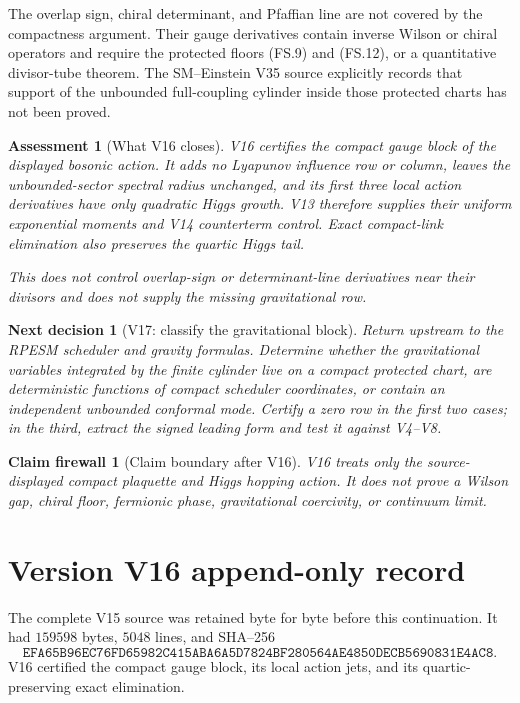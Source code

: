 \documentclass[11pt]{article}
\newtheorem{firewall}[theorem]{Claim firewall}
\newtheorem{decision}[theorem]{Next decision}
\newtheorem{assessment}[theorem]{Assessment}
\theoremstyle{remark}
\begin{document}
The overlap sign, chiral determinant, and Pfaffian line are not
covered by the compactness argument.  Their gauge derivatives
contain inverse Wilson or chiral operators and require the
protected floors \textup{(FS.9)} and \textup{(FS.12)}, or a
quantitative divisor-tube theorem.  The SM--Einstein V35 source
explicitly records that support of the unbounded full-coupling
cylinder inside those protected charts has not been proved.

\begin{assessment}[What V16 closes]
\label{ass:v17v16-status}
V16 certifies the compact gauge block of the displayed bosonic
action.  It adds no Lyapunov influence row or column, leaves the
unbounded-sector spectral radius unchanged, and its first three
local action derivatives have only quadratic Higgs growth.  V13
therefore supplies their uniform exponential moments and V14
counterterm control.  Exact compact-link elimination also preserves
the quartic Higgs tail.

This does not control overlap-sign or determinant-line derivatives
near their divisors and does not supply the missing gravitational
row.
\end{assessment}

\begin{decision}[V17: classify the gravitational block]
\label{dec:v17v16-next}
Return upstream to the RPESM scheduler and gravity formulas.
Determine whether the gravitational variables integrated by the
finite cylinder live on a compact protected chart, are deterministic
functions of compact scheduler coordinates, or contain an
independent unbounded conformal mode.  Certify a zero row in the
first two cases; in the third, extract the signed leading form and
test it against V4--V8.
\end{decision}

\begin{firewall}[Claim boundary after V16]
\label{fire:v17v16}
V16 treats only the source-displayed compact plaquette and Higgs
hopping action.  It does not prove a Wilson gap, chiral floor,
fermionic phase, gravitational coercivity, or continuum limit.
\end{firewall}

\section*{Version V16 append-only record}
The complete V15 source was retained byte for byte before this
continuation.  It had \(159598\) bytes, \(5048\) lines, and SHA--256
\[
 \texttt{EFA65B96EC76FD65982C415ABA6A5D7824BF280564AE4850DECB5690831E4AC8}.
\]
V16 certified the compact gauge block, its local action jets, and
its quartic-preserving exact elimination.
\end{document}
